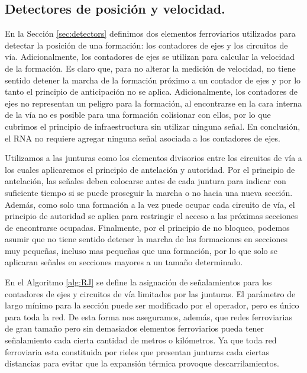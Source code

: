 \subsection{Detectores de posición y velocidad.}

    
    En la Sección \ref{sec:detectors} definimos dos elementos ferroviarios utilizados para detectar la posición de una formación: los contadores de ejes y los circuitos de vía. Adicionalmente, los contadores de ejes se utilizan para calcular la velocidad de la formación. Es claro que, para no alterar la medición de velocidad, no tiene sentido detener la marcha de la formación próximo a un contador de ejes y por lo tanto el principio de anticipación no se aplica. Adicionalmente, los contadores de ejes no representan un peligro para la formación, al encontrarse en la cara interna de la vía no es posible para una formación colisionar con ellos, por lo que cubrimos el principio de infraestructura sin utilizar ninguna señal. En conclusión, el RNA no requiere agregar ninguna señal asociada a los contadores de ejes.

    Utilizamos a las junturas como los elementos divisorios entre los circuitos de vía a los cuales aplicaremos el principio de antelación y autoridad. Por el principio de antelación, las señales deben colocarse antes de cada juntura para indicar con suficiente tiempo si se puede proseguir la marcha o no hacia una nueva sección. Además, como solo una formación a la vez puede ocupar cada circuito de vía, el principio de autoridad se aplica para restringir el acceso a las próximas secciones de encontrarse ocupadas. Finalmente, por el principio de no bloqueo, podemos asumir que no tiene sentido detener la marcha de las formaciones en secciones muy pequeñas, incluso mas pequeñas que una formación, por lo que solo se aplicaran señales en secciones mayores a un tamaño determinado.
    
    En el Algoritmo \ref{alg:RJ} se define la asignación de señalamientos para los contadores de ejes y circuitos de vía limitados por las junturas. El parámetro de largo mínimo para la sección puede ser modificado por el operador, pero es único para toda la red. De esta forma nos aseguramos, además, que redes ferroviarias de gran tamaño pero sin demasiados elementos ferroviarios pueda tener señalamiento cada cierta cantidad de metros o kilómetros. Ya que toda red ferroviaria esta constituida por rieles que presentan junturas cada ciertas distancias para evitar que la expansión térmica provoque descarrilamientos.

